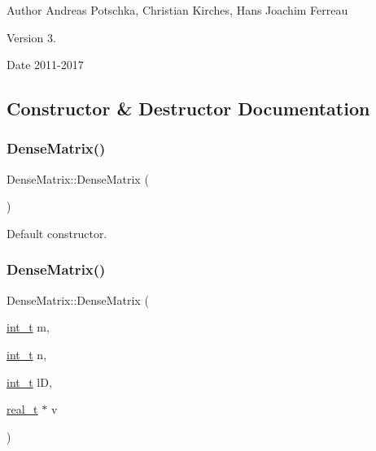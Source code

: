 \begin{DoxyAuthor}{Author}
Andreas Potschka, Christian Kirches, Hans Joachim Ferreau 
\end{DoxyAuthor}
\begin{DoxyVersion}{Version}
3. 
\end{DoxyVersion}
\begin{DoxyDate}{Date}
2011-\/2017 
\end{DoxyDate}


\subsection{Constructor \& Destructor Documentation}
\mbox{\label{class_dense_matrix_a962f1cca43a07753de96c8b9e413db06}} 
\subsubsection{\texorpdfstring{Dense\+Matrix()}{DenseMatrix()}\hspace{0.1cm}{\footnotesize\ttfamily [1/2]}}
{\footnotesize\ttfamily Dense\+Matrix\+::\+Dense\+Matrix (\begin{DoxyParamCaption}{ }\end{DoxyParamCaption})\hspace{0.3cm}{\ttfamily [inline]}}

Default constructor. \mbox{\label{class_dense_matrix_ac3f86ff10526b05dc36e508002fede15}} 
\subsubsection{\texorpdfstring{Dense\+Matrix()}{DenseMatrix()}\hspace{0.1cm}{\footnotesize\ttfamily [2/2]}}
{\footnotesize\ttfamily Dense\+Matrix\+::\+Dense\+Matrix (\begin{DoxyParamCaption}\item[{\hyperlink{_types_8hpp_ab6fd6105e64ed14a0c9281326f05e623}{int\+\_\+t}}]{m,  }\item[{\hyperlink{_types_8hpp_ab6fd6105e64ed14a0c9281326f05e623}{int\+\_\+t}}]{n,  }\item[{\hyperlink{_types_8hpp_ab6fd6105e64ed14a0c9281326f05e623}{int\+\_\+t}}]{lD,  }\item[{\hyperlink{qp_o_a_s_e_s__wrapper_8h_a0d00e2b3dfadee81331bbb39068570c4}{real\+\_\+t} $\ast$}]{v }\end{DoxyParamCaption})\hspace{0.3cm}{\ttfamily [inline]}}

